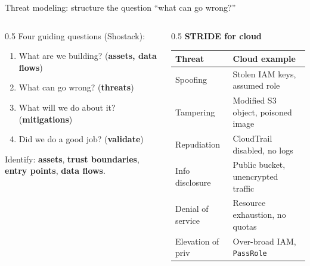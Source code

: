 \documentclass[aspectratio=169,10pt]{beamer}
\newcommand{\term}[1]{{\color{awsink}\textbf{#1}}}
\begin{document}
\begin{frame}{Threat modeling: structure the question ``what can go wrong?''}
  \begin{columns}[T]
    \begin{column}{0.5\textwidth}\small
      Four guiding questions (Shostack):
      \begin{enumerate}\setlength\itemsep{1pt}
        \item What are we building? (\term{assets, data flows})
        \item What can go wrong? (\term{threats})
        \item What will we do about it? (\term{mitigations})
        \item Did we do a good job? (\term{validate})
      \end{enumerate}
      \vspace{0.3em}
      Identify: \term{assets}, \term{trust boundaries}, \term{entry points},
      \term{data flows}.
    \end{column}
    \begin{column}{0.5\textwidth}
      \centering\scriptsize\textbf{STRIDE for cloud}
      \renewcommand{\arraystretch}{1.15}
      \begin{tabular}{l l}
        \toprule
        \textbf{Threat} & \textbf{Cloud example}\\
        \midrule
        Spoofing        & Stolen IAM keys, assumed role\\
        Tampering       & Modified S3 object, poisoned image\\
        Repudiation     & CloudTrail disabled, no logs\\
        Info disclosure & Public bucket, unencrypted traffic\\
        Denial of service& Resource exhaustion, no quotas\\
        Elevation of priv& Over-broad IAM, \texttt{PassRole}\\
        \bottomrule
      \end{tabular}
    \end{column}
  \end{columns}
\end{frame}
\end{document}
